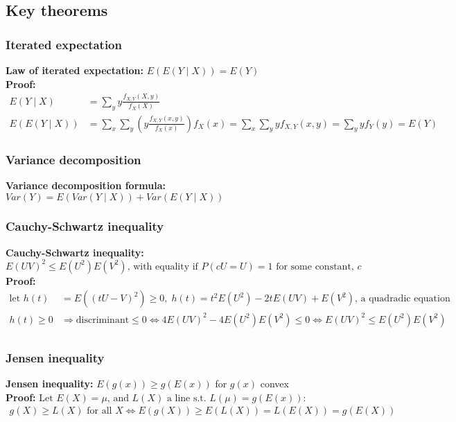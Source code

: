 \documentclass{article}
\begin{document}
\subsection{Key theorems}
\subsubsection{Iterated expectation}
\textbf{Law of iterated expectation: } $E(E(Y\mid X)) = E(Y)$\\
\textbf{Proof: }
\begin{align*}
    E(Y\mid X) &= \sum_y y\frac{f_{X, Y}(X, y)}{f_X(X)}\\
    E(E(Y\mid X)) &= \sum_x \sum_y \left ( y\frac{f_{X, Y}(x, y)}{f_X(x)} \right ) f_X(x) = \sum_x \sum_y y f_{X, Y}(x, y) = \sum_y y f_{Y}(y) = E(Y)
\end{align*}

\subsubsection{Variance decomposition}
\textbf{Variance decomposition formula: } $Var(Y) = E(Var(Y\mid X)) + Var(E(Y \mid X))$\\

\subsubsection{Cauchy-Schwartz inequality}
\textbf{Cauchy-Schwartz inequality: }$E(UV)^2 \leq E(U^2)E(V^2) \textrm{, with equality if } P(cU=U) = 1 \textrm{ for some constant, } c$\\
\textbf{Proof:}
\begin{align*}
    \textrm{let } h(t) &= E((tU - V)^2) \geq 0, \; h(t) = t^2E(U^2) - 2tE(UV) + E(V^2) \textrm{, a quadradic equation}\\
    h(t) \geq 0 &\Rightarrow \textrm{discriminant} \leq 0 \Longleftrightarrow 4E(UV)^2 - 4E(U^2)E(V^2) \leq 0 \Longleftrightarrow E(UV)^2 \leq E(U^2)E(V^2)\\
\end{align*}

\subsubsection{Jensen inequality}
\textbf{Jensen inequality: } $E(g(x)) \geq g(E(x))$ for $g(x)$ convex\\
\textbf{Proof: } $\textrm{Let } E(X) = \mu \textrm{, and } L(X) \textrm{ a line s.t. } L(\mu) = g(E(x)):$
\begin{align*}
    g(X) \geq L(X) \textrm{ for all } X \Longleftrightarrow E(g(X)) \geq E(L(X)) = L(E(X)) = g(E(X))
\end{align*}
\end{document}
